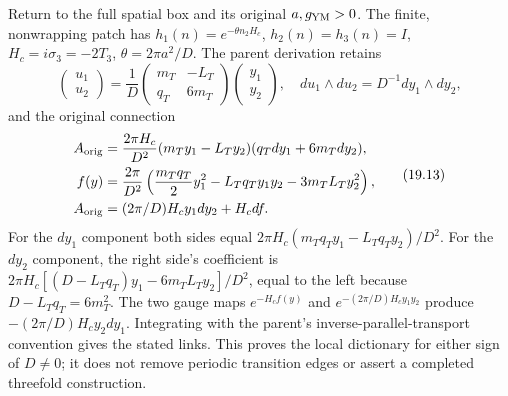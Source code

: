 \documentclass[
]{article}
\begin{document}
Return to the full spatial box and its original \(a,g_{\rm YM}>0\). The
finite, nonwrapping patch has \(h_1(n)=e^{-\theta n_2H_c}\),
\(h_2(n)=h_3(n)=I\), \(H_c=i\sigma_3=-2T_3\), \(\theta=2\pi a^2/D\). The
parent derivation retains \[
\begin{pmatrix}u_1\\u_2\end{pmatrix}
=\frac1D\begin{pmatrix}m_T&-L_T\\q_T&6m_T\end{pmatrix}
\begin{pmatrix}y_1\\y_2\end{pmatrix},\quad
du_1\wedge du_2=D^{-1}dy_1\wedge dy_2,
                                                               \tag{19.12}
\] and the original connection \[
\begin{aligned}
A_{\rm orig}&=\frac{2\pi H_c}{D^2}
(m_Ty_1-L_Ty_2)(q_Tdy_1+6m_Tdy_2),\\
f(y)&=\frac{2\pi}{D^2}
\left(\frac{m_Tq_T}{2}y_1^2-L_Tq_Ty_1y_2-3m_TL_Ty_2^2\right),\\
A_{\rm orig}&=(2\pi/D)H_cy_1dy_2+H_cdf.
\end{aligned}                                                    \tag{19.13}
\] For the \(dy_1\) component both sides equal
\(2\pi H_c(m_Tq_Ty_1-L_Tq_Ty_2)/D^2\). For the \(dy_2\) component, the
right side's coefficient is \(2\pi H_c[(D-L_Tq_T)y_1-6m_TL_Ty_2]/D^2\),
equal to the left because \(D-L_Tq_T=6m_T^2\). The two gauge maps
\(e^{-H_cf(y)}\) and \(e^{-(2\pi/D)H_cy_1y_2}\) produce
\(-(2\pi/D)H_cy_2dy_1\). Integrating with the parent's
inverse-parallel-transport convention gives the stated links. This
proves the local dictionary for either sign of \(D\ne0\); it does not
remove periodic transition edges or assert a completed threefold
construction.
\end{document}
